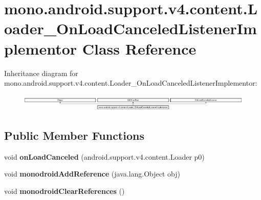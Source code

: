 \hypertarget{classmono_1_1android_1_1support_1_1v4_1_1content_1_1_loader___on_load_canceled_listener_implementor}{}\section{mono.\+android.\+support.\+v4.\+content.\+Loader\+\_\+\+On\+Load\+Canceled\+Listener\+Implementor Class Reference}
\label{classmono_1_1android_1_1support_1_1v4_1_1content_1_1_loader___on_load_canceled_listener_implementor}
Inheritance diagram for mono.\+android.\+support.\+v4.\+content.\+Loader\+\_\+\+On\+Load\+Canceled\+Listener\+Implementor\+:\begin{figure}[H]
\begin{center}
\leavevmode
\includegraphics[height=0.797721cm]{classmono_1_1android_1_1support_1_1v4_1_1content_1_1_loader___on_load_canceled_listener_implementor}
\end{center}
\end{figure}
\subsection*{Public Member Functions}
\begin{DoxyCompactItemize}
\item 
\mbox{\label{classmono_1_1android_1_1support_1_1v4_1_1content_1_1_loader___on_load_canceled_listener_implementor_a30211744da81687fe1fcdea96162b15d}} 
void {\bfseries on\+Load\+Canceled} (android.\+support.\+v4.\+content.\+Loader p0)
\item 
\mbox{\label{classmono_1_1android_1_1support_1_1v4_1_1content_1_1_loader___on_load_canceled_listener_implementor_a5e5e1c8f0bda08b7e26819e4ee995873}} 
void {\bfseries monodroid\+Add\+Reference} (java.\+lang.\+Object obj)
\item 
\mbox{\label{classmono_1_1android_1_1support_1_1v4_1_1content_1_1_loader___on_load_canceled_listener_implementor_a4eb6431594cba99ef29e0a08f9fb6904}} 
void {\bfseries monodroid\+Clear\+References} ()
\end{DoxyCompactItemize}
